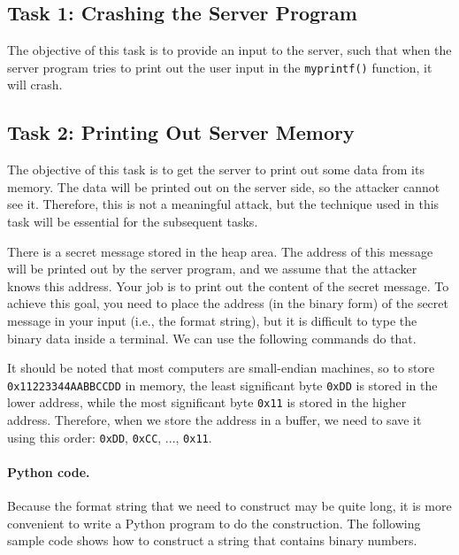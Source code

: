 \subsection{Task 1: Crashing the Server Program}

The objective of this task is to provide an input to the server, such that
when the server program tries to print out the user input in the
\texttt{myprintf()} function, it will crash.



\subsection{Task 2: Printing Out Server Memory}

The objective of this task is to get the server to print out some data
from its memory. The data will be printed out on the server side, so
the attacker cannot see it. Therefore, this is not a meaningful
attack, but the technique used in this task will be essential for
the subsequent tasks.


There is a secret message stored in the heap area. 
The address of this message will be printed out by the server 
program, and we assume that the attacker knows this address. 
Your job is to print out the content of the secret message.
To achieve this goal, you need to place the address (in the binary form)
of the secret message in your input (i.e., the format string), but
it is difficult to type the binary data inside a terminal. We can use the following commands
do that.


It should be noted that most computers are small-endian machines, so to store
\texttt{0x11223344AABBCCDD} in memory,
the least significant byte \texttt{0xDD} is stored in the lower address,
while the most significant byte \texttt{0x11} is stored in the higher
address. Therefore, when we store the address in a buffer, we need to
save it using this order: \texttt{0xDD}, \texttt{0xCC}, ..., \texttt{0x11}. 


\paragraph{Python code.} Because the format string that
we need to construct may be quite long, it is more convenient
to write a Python program to do the construction. The
following sample code shows how to construct
a string that contains binary numbers.


